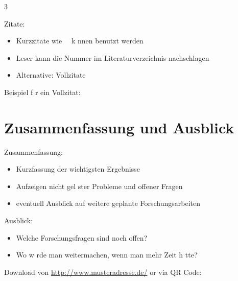 \documentclass{article}
\begin{document}
\begin{multicols}{3}
\begin{block}{Zitate:}
	\begin{itemize}
		\item Kurzzitate wie~~\cite{lanze:manuskript} k nnen benutzt werden
		\item Leser kann die Nummer im Literaturverzeichnis nachschlagen
		\item Alternative: Vollzitate
	\end{itemize}
\end{block}
\begin{block}{Beispiel f r ein Vollzitat:}
	\small{}
\end{block}

\section{Zusammenfassung und Ausblick}

\begin{block}{Zusammenfassung:}
	\begin{itemize}
		\item Kurzfassung der wichtigsten Ergebnisse
		\item Aufzeigen nicht gel ster Probleme und offener Fragen
		\item eventuell Ausblick auf weitere geplante Forschungsarbeiten
	\end{itemize}
\end{block}

\begin{block}{Ausblick:}
	\begin{itemize}
		\item Welche Forschungsfragen sind noch offen?
		\item Wo w rde man weitermachen, wenn man mehr Zeit h tte?
	\end{itemize}
\end{block}	

\begin{block}{Download von \url{http://www.musteradresse.de/} or via QR Code:}
	\begin{center}
	\end{center}
\end{block}

\end{multicols}

\printbibliography
\end{document}
